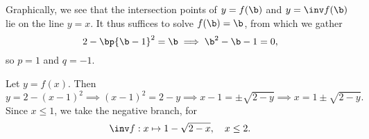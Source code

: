 \begin{solution}
\begin{ppart}
\begin{figure}[H]
        \end{figure}
    \end{ppart}
    \begin{ppart}
        Graphically, we see that the intersection points of $y = f(\b)$ and $y = \inv f(\b)$ lie on the line $y = x$. It thus suffices to solve $f(\b) = \b$, from which we gather \[2 - \bp{\b - 1}^2 = \b \implies \b^2 - \b - 1 = 0,\] so $p = 1$ and $q = -1$.
    \end{ppart}
    \begin{ppart}
        Let $y = f(x)$. Then \[y = 2 - (x-1)^2 \implies (x-1)^2 = 2-y \implies x - 1 = \pm \sqrt{2-y} \implies x = 1 \pm \sqrt{2 - y}.\] Since $x \leq 1$, we take the negative branch, for \[\inv f : x \mapsto 1 - \sqrt{2-x}, \quad x \leq 2.\]
    \end{ppart}
\end{solution}

